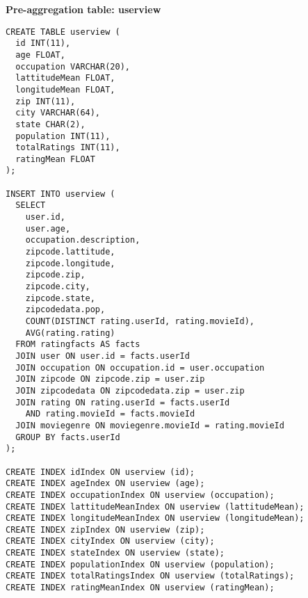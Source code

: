 \noindent\textbf{Pre-aggregation table: userview}
\begin{lstlisting}
CREATE TABLE userview (
  id INT(11),
  age FLOAT,
  occupation VARCHAR(20),
  lattitudeMean FLOAT,
  longitudeMean FLOAT,
  zip INT(11),
  city VARCHAR(64),
  state CHAR(2),
  population INT(11),
  totalRatings INT(11),
  ratingMean FLOAT
);

INSERT INTO userview (
  SELECT
    user.id,
    user.age,
    occupation.description,
    zipcode.lattitude,
    zipcode.longitude,
    zipcode.zip,
    zipcode.city,
    zipcode.state,
    zipcodedata.pop,
    COUNT(DISTINCT rating.userId, rating.movieId),
    AVG(rating.rating)
  FROM ratingfacts AS facts
  JOIN user ON user.id = facts.userId
  JOIN occupation ON occupation.id = user.occupation
  JOIN zipcode ON zipcode.zip = user.zip
  JOIN zipcodedata ON zipcodedata.zip = user.zip
  JOIN rating ON rating.userId = facts.userId 
    AND rating.movieId = facts.movieId
  JOIN moviegenre ON moviegenre.movieId = rating.movieId
  GROUP BY facts.userId
);

CREATE INDEX idIndex ON userview (id);
CREATE INDEX ageIndex ON userview (age);
CREATE INDEX occupationIndex ON userview (occupation);
CREATE INDEX lattitudeMeanIndex ON userview (lattitudeMean);
CREATE INDEX longitudeMeanIndex ON userview (longitudeMean);
CREATE INDEX zipIndex ON userview (zip);
CREATE INDEX cityIndex ON userview (city);
CREATE INDEX stateIndex ON userview (state);
CREATE INDEX populationIndex ON userview (population);
CREATE INDEX totalRatingsIndex ON userview (totalRatings);
CREATE INDEX ratingMeanIndex ON userview (ratingMean);
\end{lstlisting}